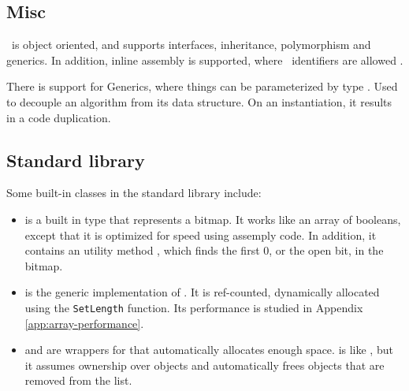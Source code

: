 \subsection{Misc}
\label{sec:Misc}
\delphi~is object oriented, and supports interfaces, inheritance, polymorphism and generics. In addition, inline assembly is supported, where \delphi~identifiers are allowed \cite{noauthor_undated-px}.

There is support for Generics, where things can be parameterized by type \cite{noauthor_undated-sx}. Used to decouple an algorithm from its data structure. On an instantiation, it results in a code duplication.

\subsection{Standard library}
\label{sub:Standard library}
Some built-in classes in the standard library include:
\begin{itemize}
    \item {} is a built in type that represents a bitmap. It works like an array of booleans, except that it is optimized for speed using assemply code. In addition, it contains an utility method , which finds the first 0, or the open bit, in the bitmap.
    \item {} is the generic implementation of . It is ref-counted, dynamically allocated using the \texttt{SetLength} function. Its performance is studied in Appendix \ref{app:array-performance}.
    \item {} and  are wrappers for  that automatically allocates enough space.  is like , but it assumes ownership over objects and automatically frees objects that are removed from the list.
\end{itemize}

